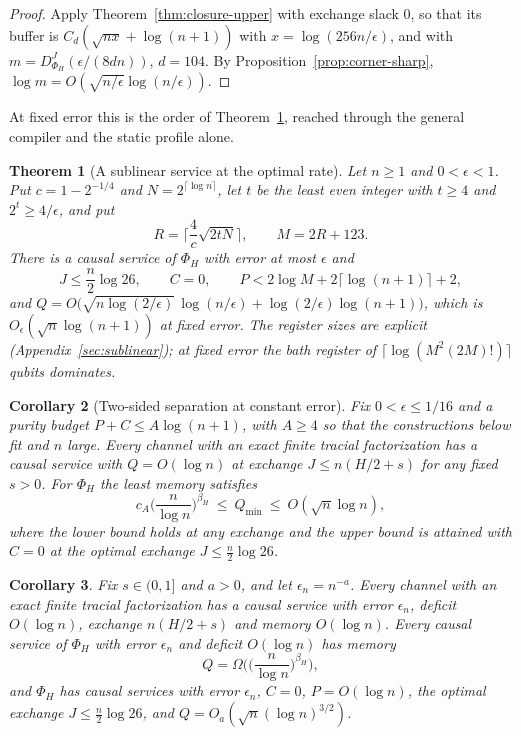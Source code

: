 \documentclass[11pt,a4paper]{article}
\theoremstyle{plain}
\newtheorem{theorem}{Theorem}[section]
\newtheorem{corollary}[theorem]{Corollary}
\theoremstyle{definition}
\theoremstyle{remark}
\newcommand{\DChoi}{D^{J}}
\begin{document}
\begin{proof}
Apply Theorem~\ref{thm:closure-upper} with exchange slack $0$, so that its buffer is $C_d(\sqrt{nx}+\log(n+1))$ with $x=\log(256n/\epsilon)$,
and with $m=\DChoi_{\Phi_H}(\epsilon/(8dn))$, $d=104$. By Proposition~\ref{prop:corner-sharp}, $\log m=O(\sqrt{n/\epsilon}\log(n/\epsilon))$.
\end{proof}

At fixed error this is the order of Theorem~\ref{thm:sublinear}, reached through the general compiler and the static profile
alone.


\begin{theorem}[A sublinear service at the optimal rate]\label{thm:sublinear}
Let $n\ge1$ and $0<\epsilon<1$. Put $c=1-2^{-1/4}$ and $N=2^{\lceil\log n\rceil}$, let $t$ be the least even integer with $t\ge4$ and
$2^t\ge4/\epsilon$, and put
\[
R=\Big\lceil\frac4c\sqrt{2tN}\Big\rceil,\qquad M=2R+123 .
\]
There is a causal service of $\Phi_H$ with error at most $\epsilon$ and
\[
J\le\frac n2\log26,\qquad C=0,\qquad P<2\log M+2\lceil\log(n+1)\rceil+2,
\]
and $Q=O\big(\sqrt{n\log(2/\epsilon)}\,\log(n/\epsilon)+\log(2/\epsilon)\log(n+1)\big)$, which is $O_\epsilon(\sqrt n\log(n+1))$ at fixed
error. The register sizes are explicit (Appendix~\ref{sec:sublinear}); at fixed error the bath register of $\lceil\log(M^2(2M)!)\rceil$
qubits dominates.
\end{theorem}

\begin{corollary}[Two-sided separation at constant error]\label{cor:two-sided}
Fix $0<\epsilon\le1/16$ and a purity budget $P+C\le A\log(n+1)$, with $A\ge4$ so that the constructions below fit and $n$ large. Every channel with an exact finite tracial
factorization has a causal service with $Q=O(\log n)$ at exchange $J\le n(H/2+s)$ for any fixed $s>0$. For $\Phi_H$
the least memory satisfies
\[
c_A\Big(\frac n{\log n}\Big)^{\beta_H}\ \le\ Q_{\min}\ \le\ O(\sqrt n\log n),
\]
where the lower bound holds at any exchange and the upper bound is attained with $C=0$ at the optimal exchange
$J\le\frac n2\log26$.
\end{corollary}


\begin{corollary}\label{cor:separation}
Fix $s\in(0,1]$ and $a>0$, and let $\epsilon_n=n^{-a}$. Every channel with an exact finite tracial factorization
has a causal service with error $\epsilon_n$, deficit $O(\log n)$, exchange $n(H/2+s)$ and memory $O(\log n)$. Every
causal service of $\Phi_H$ with error $\epsilon_n$ and deficit $O(\log n)$ has memory
\[
Q=\Omega\Big(\Big(\frac{n}{\log n}\Big)^{\beta_H}\Big),
\]
and $\Phi_H$ has causal services with error $\epsilon_n$, $C=0$, $P=O(\log n)$, the optimal exchange $J\le\frac n2\log26$, and
$Q=O_a(\sqrt n(\log n)^{3/2})$.
\end{corollary}
\end{document}
